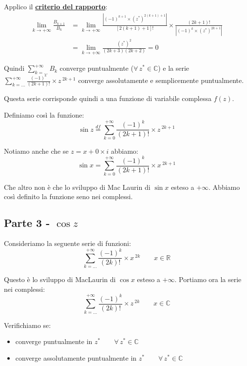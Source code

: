 \documentclass[../dimostrazioni]{subfiles}
\begin{document}
                Applico il \textbf{\hyperref[criterioRapportoSerie]{criterio del rapporto}}:
                \begin{align*}
                    \lim_{k \to +\infty} \frac{B_{k+1}}{B_k} &= \lim_{k \to +\infty} \frac{\left| (-1)^{k+1} \times (z^*)^{2(k+1)+1}\right|}{\left[2(k+1)+1\right]!} \times \frac{\left(2k+1\right)!}{\left| (-1)^k \times (z^*)^{2k+1}\right|} \\
                    &= \lim_{k \to +\infty} \frac{(z^*)^2}{(2k+3)(2k+2)} = 0
                \end{align*}

                Quindi \(\sum_{k=\dots}^{+\infty} B_k\) converge puntualmente (\(\forall \, z^* \in \mathbb{C}\)) 
                e la serie  \(\sum_{k=\dots}^{+\infty} \frac{(-1)^k}{(2k+1)!} \times z\,^{2k+1}\) converge assolutamente e semplicemente puntualmente.

                Questa serie corrisponde quindi a una funzione di variabile complessa \(f(z)\).

                Definiamo così la funzione:
                \[  \sin z \stackrel{df}{=} \sum_{k=0}^{+\infty} \frac{(-1)^k}{(2k+1)!} \times z\,^{2k+1}    \]

                Notiamo anche che se \(z = x + 0 \times i\) abbiamo:
                \[  \sin x = \sum_{k=0}^{+\infty} \frac{(-1)^k}{(2k+1)!} \times x\,^{2k+1} \]

                Che altro non è che lo sviluppo di Mac Laurin di \(\sin x\) esteso a \(+\infty\). 
                Abbiamo così definito la funzione seno nei complessi.

            \subsection*{Parte 3 - \(\cos z\)}

                Consideriamo la seguente serie di funzioni:
                \[  \sum_{k=\dots}^{+\infty} \frac{(-1)^k}{(2k)!} \times x\,^{2k} \qquad x \in \mathbb{R}  \]

                Questo è lo sviluppo di MacLaurin di \(\cos x\) esteso a \(+ \infty\). Portiamo ora la serie nei complessi:
                \[  \sum_{k=\dots}^{+\infty} \frac{(-1)^k}{(2k)!} \times z\,^{2k} \qquad x \in \mathbb{C}  \]

                \newpage

                Verifichiamo se:
                \begin{itemize}
                    \item converge puntualmente in \(z^* \qquad \forall \, z^*  \in \mathbb{C}\)
                    \item converge assolutamente puntualmente in \(z^* \qquad \forall \, z^*  \in \mathbb{C}\)
                \end{itemize}
            
\end{document}
